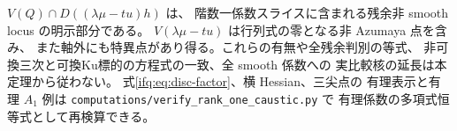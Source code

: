 \begin{remark}[全残余判別との区別]
\label{ifq:rem:scope}
$V(Q)\cap D((\lambda\mu-tu)h)$ は、
階数一係数スライスに含まれる残余非 smooth locus の明示部分である。
$V(\lambda\mu-tu)$ は行列式の零となる非 Azumaya 点を含み、
また軸外にも特異点があり得る。これらの有無や全残余判別の等式、
非可換三次と可換Ku標的の方程式の一致、全 smooth 係数への
実比較核の延長は本定理から従わない。
式\eqref{ifq:eq:disc-factor}、横 Hessian、三尖点の
有理表示と有理 $A_1$ 例は
\texttt{computations/verify\_rank\_one\_caustic.py} で
有理係数の多項式恒等式として再検算できる。
\end{remark}
